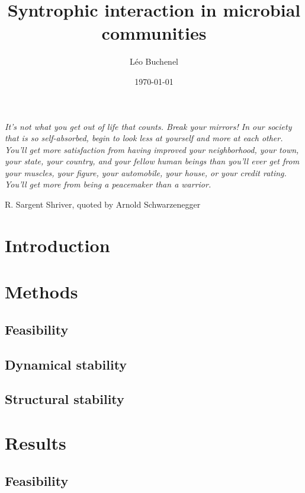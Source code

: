 \documentclass[12pt, titlepage, twoside, openright]{report}
\begin{document}
  \title{Syntrophic interaction in microbial communities}
  \author{L\'eo Buchenel}
  \date{\today}
  \maketitle
  \thispagestyle{empty}
  \vspace*{\fill}
  \epigraph{\itshape It's not what you get out of life that counts. Break your mirrors! In our society that is so self-absorbed, begin to look less at yourself and more at each other. You'll get more satisfaction from having improved your neighborhood, your town, your state, your country, and your fellow human beings than you'll ever get from your muscles, your figure, your automobile, your house, or your credit rating. You'll get more from being a peacemaker than a warrior.}{R. Sargent Shriver, quoted by Arnold Schwarzenegger}
  \vspace*{\fill}
  \tableofcontents
  \chapter{Introduction}
  

  \chapter{Methods}
  \section{Feasibility}\label{sec : methods feasibility}
  
  \FloatBarrier
  \newpage
  \section{Dynamical stability}\label{sec : methods dynamical stability}
  
  \FloatBarrier
  \newpage
  \section{Structural stability}
  
  \chapter{Results}\label{chapter : results}
  \section{Feasibility}
  
  \FloatBarrier
  \newpage
\end{document}
